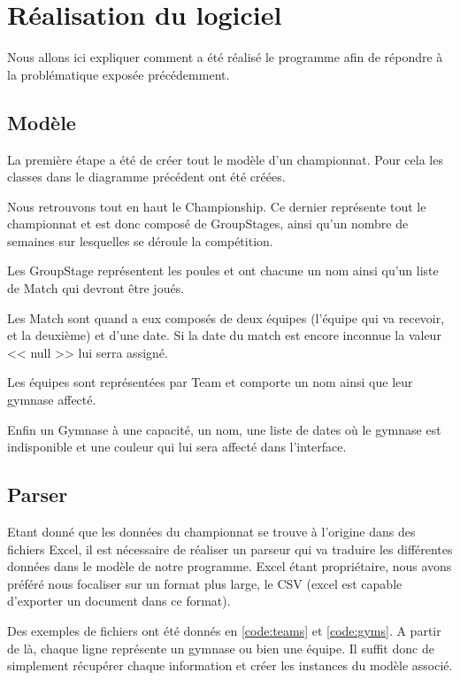 \documentclass[final, noposter]{polytech/polytech}
\begin{document}
\chapter{Réalisation du logiciel}
	Nous allons ici expliquer comment a été réalisé le programme afin de répondre à la problématique exposée précédemment.
	
	\section{Modèle}
		
		La première étape a été de créer tout le modèle d'un championnat.
		Pour cela les classes dans le diagramme précédent ont été créées.
		
		Nous retrouvons tout en haut le Championship.
		Ce dernier représente tout le championnat et est donc composé de GroupStages, ainsi qu'un nombre de semaines sur lesquelles se déroule la compétition.
		
		Les GroupStage représentent les poules et ont chacune un nom ainsi qu'un liste de Match qui devront être joués.
		
		Les Match sont quand a eux composés de deux équipes (l'équipe qui va recevoir, et la deuxième) et d'une date.
		Si la date du match est encore inconnue la valeur << null >> lui serra assigné.
		
		Les équipes sont représentées par Team et comporte un nom ainsi que leur gymnase affecté.

		Enfin un Gymnase à une capacité, un nom, une liste de dates où le gymnase est indisponible et une couleur qui lui sera affecté dans l'interface.

	\section{Parser}
		Etant donné que les données du championnat se trouve à l'origine dans des fichiers Excel, il est nécessaire de réaliser un parseur qui va traduire les différentes données dans le modèle de notre programme.
		Excel étant propriétaire, nous avons préféré nous focaliser sur un format plus large, le CSV (excel est capable d'exporter un document dans ce format).
		
		Des exemples de fichiers ont été donnés en \autoref{code:teams} et \autoref{code:gyms}.
		A partir de là, chaque ligne représente un gymnase ou bien une équipe.
		Il suffit donc de simplement récupérer chaque information et créer les instances du modèle associé.
		
\end{document}
